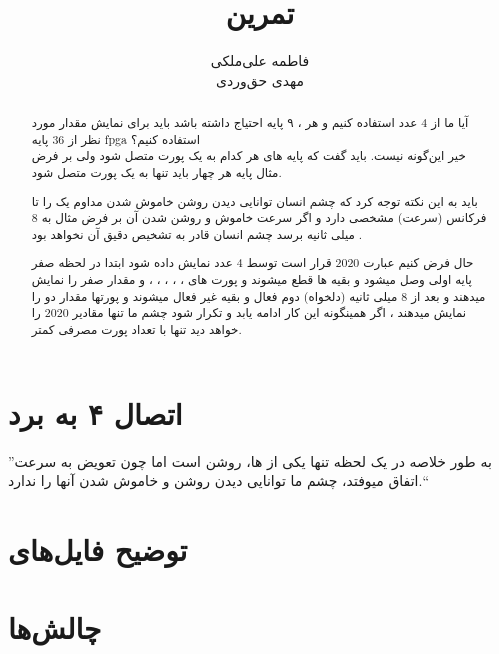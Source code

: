 \documentclass[dvipsnames, svgnames, x11names, a4paper, 11pt]{article}
\title{تمرین \lr{7-Segement}}
\author{
فاطمه علی‌ملکی \\
مهدی حق‌وردی
}
\begin{document}
\maketitle
\tableofcontents

\section{اتصال ۴  به برد }
\begin{abstract}
آیا ما از 4 عدد  استفاده کنیم و هر ، ۹ پایه احتیاج داشته باشد باید برای نمایش مقدار مورد نظر از 36 پایه fpga استفاده کنیم؟ \\

خیر این‌گونه نیست. باید گفت که پایه های
هر کدام به یک پورت متصل شود ولی بر فرض مثال پایه  هر چهار  باید تنها به یک پورت متصل شود.

باید به این نکته توجه کرد که چشم انسان توانایی دیدن روشن خاموش شدن مداوم یک  را تا فرکانس (سرعت) مشخصی دارد و اگر سرعت خاموش و روشن شدن آن بر فرض مثال به 8 میلی ثانیه برسد چشم انسان  قادر به تشخیص دقیق آن نخواهد بود .

حال فرض کنیم عبارت 2020 قرار است توسط 4 عدد  نمایش داده شود ابتدا در لحظه صفر پایه  اولی وصل میشود  و بقیه  ها قطع میشوند و پورت های 
،
،
،
، 
،
 و
مقدار صفر را نمایش میدهند و بعد از 8 میلی ثانیه (دلخواه)  دوم فعال و بقیه غیر فعال میشوند و پورتها مقدار دو را نمایش میدهند ، اگر همینگونه این کار ادامه یابد و تکرار شود چشم ما تنها مقادیر 2020 را خواهد دید تنها با تعداد پورت مصرفی کمتر.
\end{abstract}
''به طور خلاصه در یک لحظه تنها یکی از ها، روشن است اما چون تعویض به سرعت اتفاق میوفتد، چشم ما توانایی دیدن روشن و خاموش شدن آنها را ندارد.``
\section{توضیح فایل‌های }
\section{چالش‌ها}
\end{document}
